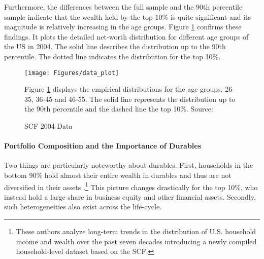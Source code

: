 \documentclass[a4paper,12pt,legno]{article}
\begin{document}
Furthermore, the differences between the full sample and the 90th percentile sample indicate that the wealth held by the top 10\% is quite significant and its magnitude is relatively increasing in the age groups. Figure \ref{scf_data} confirms these findings. It plots the detailed net-worth distribution for different age groups of the US in 2004. The solid line describes the distribution up to the 90th percentile. The dotted line indicates the distribution for the top 10\%. 
\begin{figure}[!htbp]
\caption{SCF 2004 Data} 
\label{scf_data}	%
\centering
\texttt{[image: Figures/data\_plot]}  %

\begin{minipage}{0.8\linewidth}
\footnotesize{Figure \ref{scf_data} displays the empirical distributions for the age groups, 26-35, 36-45 and 46-55. The solid line represents the distribution up to the 90th percentile and the dashed line the top 10\%. Source: \cite{hintermaier2011}}
\end{minipage}

\end{figure}

\paragraph{Portfolio Composition and the Importance of Durables}
Two things are particularly noteworthy about durables. First, households in the bottom 90\% hold almost their entire wealth in durables and thus are not diversified in their assets \citep{kuhn2017income}.\footnote{These authors analyze long-term trends in the distribution of U.S. household income and wealth over the past seven decades introducing a newly compiled household-level dataset based on the SCF.} This picture changes drastically for the top 10\%, who instead hold a large share in business equity and other financial assets. Secondly, such heterogeneities also exist across the life-cycle. 
\end{document}
